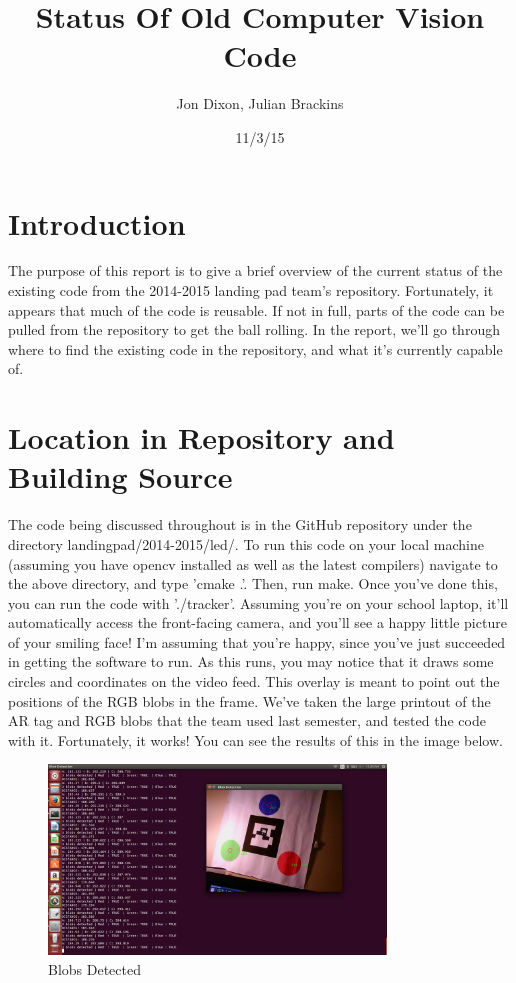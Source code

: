 \documentclass{article}
\title{Status Of Old Computer Vision Code}
\date{11/3/15}
\author{Jon Dixon, Julian Brackins}
\begin{document}
	\maketitle
	\newpage
	
	\section{Introduction}
	The purpose of this report is to give a brief overview of the current status of the existing code from the 2014-2015 landing pad team's repository. Fortunately, it appears that much of the code is reusable. If not in full, parts of the code can be pulled from the repository to get the ball rolling. In the report, we'll go through where to find the existing code in the repository, and what it's currently capable of.
	
	\section{Location in Repository and Building Source}
	The code being discussed throughout is in the GitHub repository under the directory landingpad/2014-2015/led/. To run this code on your local machine (assuming you have opencv installed as well as the latest compilers) navigate to the above directory, and type 'cmake .'. Then, run make. Once you've done this, you can run the code with './tracker'. Assuming you're on your school laptop, it'll automatically access the front-facing camera, and you'll see a happy little picture of your smiling face! I'm assuming that you're happy, since you've just succeeded in getting the software to run. As this runs, you may notice that it draws some circles and coordinates on the video feed. This overlay is meant to point out the positions of the RGB blobs in the frame. We've taken the large printout of the AR tag and RGB blobs that the team used last semester, and tested the code with it. Fortunately, it works! You can see the results of this in the image below.
	
	\begin{figure}[p]
		\centering
		\includegraphics[width=0.8\textwidth]{coolpic.png}
		\caption{Blobs Detected}
	\end{figure}
	
\end{document}
